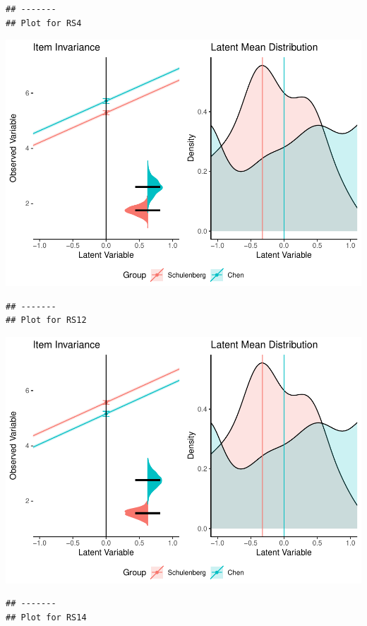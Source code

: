 \documentclass[
  man]{apa7}
\begin{document}
\begin{verbatim}
## -------
## Plot for RS4
\end{verbatim}

\includegraphics{manuscript_files/figure-latex/unnamed-chunk-103-3.pdf}

\begin{verbatim}
## -------
## Plot for RS12
\end{verbatim}

\includegraphics{manuscript_files/figure-latex/unnamed-chunk-103-4.pdf}

\begin{verbatim}
## -------
## Plot for RS14
\end{verbatim}
\end{document}
